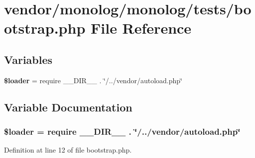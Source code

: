\section{vendor/monolog/monolog/tests/bootstrap.php File Reference}
\label{monolog_2monolog_2tests_2bootstrap_8php}
\subsection*{Variables}
\begin{DoxyCompactItemize}
\item 
{\bf \$loader} = require \+\_\+\+\_\+\+D\+I\+R\+\_\+\+\_\+ . \char`\"{}/../vendor/autoload.\+php\char`\"{}
\end{DoxyCompactItemize}


\subsection{Variable Documentation}
\subsubsection[{\$loader}]{\setlength{\rightskip}{0pt plus 5cm}\$loader = require \+\_\+\+\_\+\+D\+I\+R\+\_\+\+\_\+ . \char`\"{}/../vendor/autoload.\+php\char`\"{}}\label{monolog_2monolog_2tests_2bootstrap_8php_ab832f4c463ee1c9ba2e9464265f7ea3b}


Definition at line 12 of file bootstrap.\+php.

